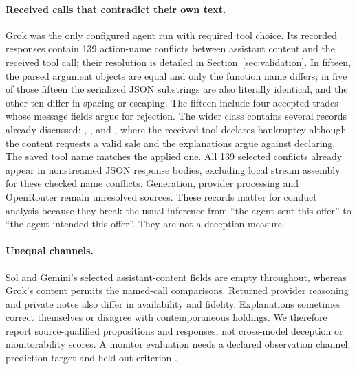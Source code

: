 \paragraph{Received calls that contradict their own text.}
Grok was the only configured agent run with required tool choice. Its recorded responses contain 139 action-name conflicts between assistant content and the received tool call; their resolution is detailed in Section~\ref{sec:validation}. In fifteen, the parsed argument objects are equal and only the function name differs; in five of those fifteen the serialized JSON substrings are also literally identical, and the other ten differ in spacing or escaping. The fifteen include four accepted trades whose message fields argue for rejection. The wider class contains several records already discussed: , ,  and , where the received tool declares bankruptcy although the content requests a valid sale and the explanations argue against declaring. The saved tool name matches the applied one. All 139 selected conflicts already appear in nonstreamed JSON response bodies, excluding local stream assembly for these checked name conflicts. Generation, provider processing and OpenRouter remain unresolved sources. These records matter for conduct analysis because they break the usual inference from ``the agent sent this offer'' to ``the agent intended this offer''. They are not a deception measure.

\paragraph{Unequal channels.}
Sol and Gemini's selected assistant-content fields are empty throughout, whereas Grok's content permits the named-call comparisons. Returned provider reasoning and private notes also differ in availability and fidelity. Explanations sometimes correct themselves or disagree with contemporaneous holdings. We therefore report source-qualified propositions and responses, not cross-model deception or monitorability scores. A monitor evaluation needs a declared observation channel, prediction target and held-out criterion \citep{korbak2025monitorability}.

